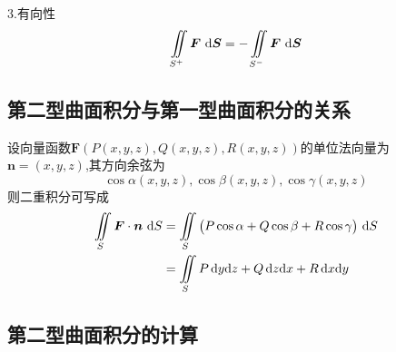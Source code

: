 \par 3.有向性
\begin{equation}
	\iint\limits_{S^+}\bm{F}\,\,{\rm{d}} \bm{S} = -\iint\limits_{S^-}\bm{F}\,\,{\rm{d}} \bm{S} 
\end{equation}

\subsection{第二型曲面积分与第一型曲面积分的关系}
\vspace*{-1em}

\theorem[第二型曲面积分与第一型曲面积分的关系]
设向量函数$\bm{F}(P(x,y,z),Q(x,y,z),R(x,y,z))$的单位法向量为$\bm{n}=(x,y,z)$,其方向余弦为
\[
\cos \alpha (x,y,z),\cos \beta (x,y,z),\cos \gamma(x,y,z)
\]
则二重积分可写成
\begin{equation}
	\begin{split}
		\iint\limits_{S}\bm{F}\cdot \bm{n}\,\,{\rm{d}} S&=\iint\limits_{S}\big(P\cos \alpha +Q\cos \beta +R\cos \gamma \big)\,\,{\rm{d}} S\\
		&=\iint\limits_{S}P \,{\rm{d}} y{\rm{d}} z+Q\,{\rm{d}} z{\rm{d}} x+R\,{\rm{d}} x{\rm{d}} y
	\end{split}
\end{equation}

\subsection{第二型曲面积分的计算}
\begin{table}[h]
	\centering
	\caption{不同的曲面方程的方向余弦}
	\renewcommand{\arraystretch}{1}
	\label{方向余弦}
\end{table} 


